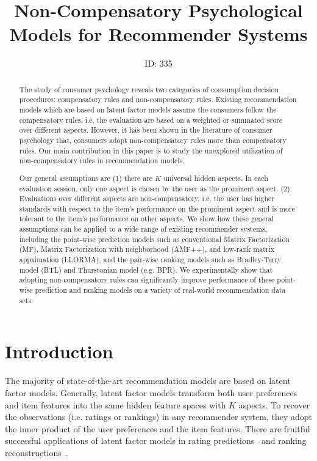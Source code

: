 \documentclass[letterpaper]{article} %
\begin{document}
%
\title{Non-Compensatory Psychological Models for Recommender Systems}
\author{ID: 335
}
\maketitle
\begin{abstract}
The study of consumer psychology reveals two categories of consumption decision procedures: compensatory rules and non-compensatory rules. Existing recommendation models which are based on latent factor models assume the consumers follow the compensatory rules, i.e. the evaluation are based on a weighted or summated score over different aspects. However, it has been shown in the literature of consumer psychology that, consumers adopt non-compensatory rules more than compensatory rules. Our main contribution in this paper is to study the unexplored utilization of non-compensatory rules in recommendation models. 

Our general assumptions are (1) there are $K$ universal hidden aspects. In each evaluation session, only one aspect is chosen by the user as the prominent aspect. (2) Evaluations over different aspects are non-compensatory, i.e. the user has higher standards with respect to the item's performance on the prominent aspect and is more tolerant to the item's performance on other aspects. We show how these general assumptions can be applied to a wide range of existing recommender systems, including the point-wise prediction models such as conventional Matrix Factorization (MF), Matrix Factorization with neighborhood (AMF++), and low-rank matrix appximation (LLORMA), and the pair-wise ranking models such as Bradley-Terry model (BTL) and Thurstonian model (e.g. BPR).  We experimentally show that adopting non-compensatory rules can significantly improve performance of these point-wise prediction and ranking models on a variety of real-world recommendation data sets.
\end{abstract}



\section{Introduction}\label{sec:introduction}
The majority of state-of-the-art recommendation models are based on latent factor models. Generally, latent factor models transform both user preferences and item features into the same hidden feature spaces with $K$ aspects. To recover the observations (i.e. ratings or rankings) in any recommender system, they adopt the inner product of the user preferences and the item features. There are fruitful successful applications of latent factor models in  rating predictions~\cite{Koren2009Matrix,Koren2010Factor,Lee2014Local} and ranking reconstructions~\cite{Rendle2009BPR,Steck2015Gaussian,Zhao2018Factored,Shi2010List}.   
\end{document}
